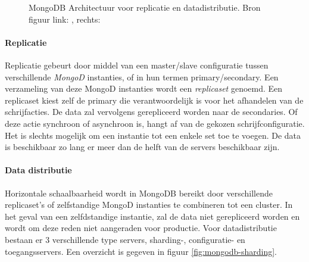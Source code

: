 \begin{figure}[ht!] 
\centering
	\hfill
	\caption{MongoDB Architectuur voor replicatie en datadistributie. Bron figuur link: \cite{mongodb-replicaset}, rechts: \cite{mongodb-shard}}
	\label{fig:mongodb-architectuur}
\end{figure}

\paragraph{Replicatie\cite{mongodb-replicaset}} Replicatie gebeurt door middel van een master/slave configuratie tussen verschillende \textit{MongoD} instanties, of in hun termen primary/secondary. Een verzameling van deze MongoD instanties wordt een \textit{replicaset} genoemd. Een replicaset kiest zelf de primary die verantwoordelijk is voor het afhandelen van de schrijfacties. De data zal vervolgens gerepliceerd worden naar de secondaries. Of deze actie synchroon of asynchroon is, hangt af van de gekozen schrijfconfiguratie.  Het is slechts mogelijk om een instantie tot een enkele set toe te voegen. De data is beschikbaar zo lang er meer dan de helft van de servers beschikbaar zijn. 

\paragraph{Data distributie\cite{mongodb-shard}} Horizontale schaalbaarheid wordt in MongoDB bereikt door verschillende replicaset's of zelfstandige MongoD instanties te combineren tot een cluster. In het geval van een zelfdstandige instantie, zal de data niet gerepliceerd worden en wordt om deze reden niet aangeraden voor productie. Voor datadistributie bestaan er 3 verschillende type servers, sharding-, configuratie- en toegangsservers. Een overzicht is gegeven in figuur \ref{fig:mongodb-sharding}. 

